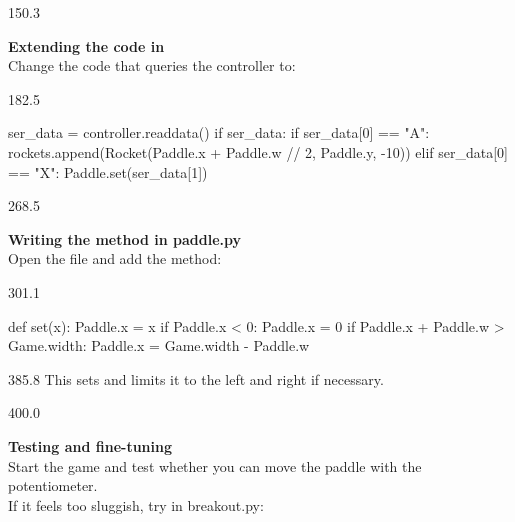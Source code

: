 \documentclass{aslab}
\begin{document}
\begin{region}[pitch=13.3]{150.3}
\begin{tasks}
\item \textbf{Extending the code in }\\
  Change the code that queries the controller to:
\end{tasks}
\end{region}

\begin{region}[x=74.7,right=0,pitch=13.26]{182.5}
\begin{codeblock}
ser_data = controller.readdata()
if ser_data:
   if ser_data[0] == "A":
      rockets.append(Rocket(Paddle.x + Paddle.w // 2, Paddle.y, -10))
   elif ser_data[0] == "X":
       Paddle.set(ser_data[1])
\end{codeblock}
\end{region}

\begin{region}[pitch=13.6]{268.5}
\begin{tasks}[start=2]
\item \textbf{Writing the method  in paddle.py}\\
  Open the file  and add the method:
\end{tasks}
\end{region}

\begin{region}[x=74.7,right=0,pitch=13.2]{301.1}
\begin{codeblock}
def set(x):
    Paddle.x = x
    if Paddle.x < 0:
        Paddle.x = 0
    if Paddle.x + Paddle.w > Game.width:
        Paddle.x = Game.width - Paddle.w
\end{codeblock}
\end{region}

\begin{region}[x=74.7,right=0]{385.8}
This sets  and limits it to the left and right if necessary.
\end{region}

\begin{region}[pitch=13.25]{400.0}
\begin{tasks}[start=3]
\item \textbf{Testing and fine-tuning}\\
  Start the game and test whether you can move the paddle with the
  potentiometer.\\
  If it feels too sluggish, try in breakout.py:
\end{tasks}
\end{region}
\end{document}
